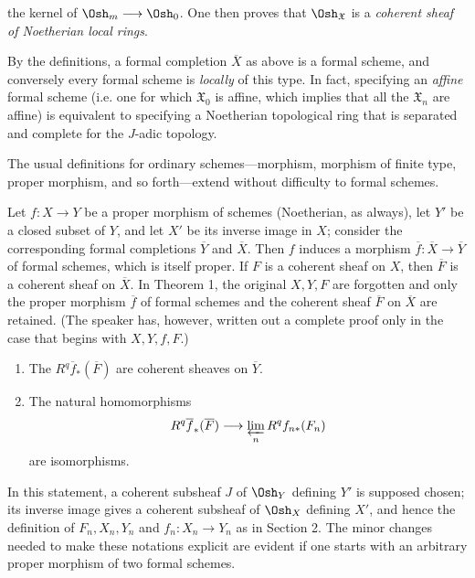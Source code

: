 the kernel of $\Osh_m\longrightarrow\Osh_0$. One then proves that
$\Osh_{\mathfrak X}$ is a \emph{coherent sheaf of Noetherian local rings}.

By the definitions, a formal completion $\overline X$ as above is a formal
scheme, and conversely every formal scheme is \emph{locally} of this type. In
fact, specifying an \emph{affine} formal scheme (i.e. one for which
$\mathfrak X_0$ is affine, which implies that all the $\mathfrak X_n$ are
affine) is equivalent to specifying a Noetherian topological ring that is
separated and complete for the $J$-adic topology.

The usual definitions for ordinary schemes---morphism, morphism of finite type,
proper morphism, and so forth---extend without difficulty to formal schemes.


Let $f:X\longrightarrow Y$ be a proper morphism of schemes (Noetherian, as
always), let $Y'$ be a closed subset of $Y$, and let $X'$ be its inverse image
in $X$; consider the corresponding formal completions $\overline Y$ and
$\overline X$. Then $f$ induces a morphism
$\overline f:\overline X\longrightarrow\overline Y$ of formal schemes, which
is itself proper. If $F$ is a coherent sheaf on $X$, then $\overline F$ is a
coherent sheaf on $\overline X$. In Theorem 1, the original $X,Y,F$ are
forgotten and only the proper morphism $\overline f$ of formal schemes and the
coherent sheaf $\overline F$ on $\overline X$ are retained. (The speaker has,
however, written out a complete proof only in the case that begins with
$X,Y,f,F$.)

\begin{enumerate}
  \item[\textit{i.}] The $R^{q}\overline f_{*}(\overline F)$ are coherent
    sheaves on $\overline Y$.
  \item[\textit{ii.}] The natural homomorphisms
    \[
      R^{q}\overline f_{*}(\overline F)
      \longrightarrow \varprojlim_n R^{q}f_{n*}(F_n)
    \]
    are isomorphisms.
\end{enumerate}

In this statement, a coherent subsheaf $J$ of $\Osh_Y$ defining $Y'$ is
supposed chosen; its inverse image gives a coherent subsheaf of $\Osh_X$
defining $X'$, and hence the definition of $F_n,X_n,Y_n$ and
$f_n:X_n\longrightarrow Y_n$ as in Section 2. The minor changes needed to make
these notations explicit are evident if one starts with an arbitrary proper
morphism of two formal schemes.

